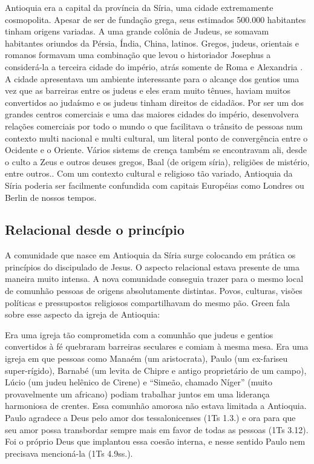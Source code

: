 \documentclass[
	12pt,				%
	openright,			%
	twoside,			%
	a4paper,			%
	english,			%
	french,				%
	spanish,			%
	brazil				%
	]{abntex2}
\begin{document}
Antioquia era a capital da província da Síria, uma cidade extremamente cosmopolita. Apesar de ser de fundação grega, seus estimados 500.000 habitantes tinham origens variadas. A uma grande colônia de Judeus, se somavam habitantes oriundos da Pérsia, Índia, China, latinos. Gregos, judeus, orientais e romanos formavam uma combinação que levou o historiador Josephus a considerá-la a terceira cidade do império, atrás somente de Roma e Alexandria \cite[185]{stott}. A cidade apresentava um ambiente interessante para o alcançe dos gentios uma vez que as barreiras entre os judeus e eles eram muito tênues, haviam muitos convertidos ao judaísmo e os judeus tinham direitos de cidadãos. Por ser um dos grandes centros comerciais e uma das maiores cidades do império, desenvolvera relações comerciais por todo o mundo o que facilitava o trânsito de pessoas num contexto multi nacional e multi cultural, um literal ponto de convergência entre o Ocidente e o Oriente. Vários sistems de crença também se encontravam ali, desde o culto a Zeus e outros deuses gregos, Baal (de origem síria), religiões de mistério, entre outros.\cite[166,167]{green}. Com um contexto cultural e religioso tão variado, Antioquia da Síria poderia ser facilmente  confundida com capitais Européias como Londres ou Berlin de nossos tempos.

\subsection {Relacional desde o princípio}

A comunidade que nasce em Antioquia da Síria surge colocando em prática os princípios do discipulado de Jesus. O aspecto relacional estava presente de uma maneira muito intensa. A nova comunidade conseguia trazer para o mesmo local de comunhão pessoas de origens absolutamente distintas. Povos, culturas, visões políticas e pressupostos religiosos compartilhavam do mesmo pão. Green fala sobre esse aspecto da igreja de Antioquia:

\begin{citacao}
Era uma igreja tão comprometida com a comunhão que judeus e gentios convertidos à fé quebraram barreiras seculares e comiam à mesma mesa. Era uma igreja em que pessoas como Manaém (um aristocrata), Paulo (um ex-fariseu super-rígido), Barnabé (um levita de Chipre e antigo proprietário de um campo), Lúcio (um judeu helênico de Cirene) e “Simeão, chamado Níger” (muito provavelmente um africano)
podiam trabalhar juntos em uma liderança harmoniosa de crentes. Essa comunhão amorosa não estava limitada a Antioquia. Paulo agradece a Deus pelo amor dos tessalonicenses (1Ts 1.3.) e ora para que seu amor possa transbordar sempre mais em favor de todas as pessoas (1Ts 3.12). Foi o próprio Deus que
implantou essa coesão interna, e nesse sentido Paulo nem precisava mencioná-la (1Ts 4.9ss.).
\end{citacao}\cite[261]{green}
\end{document}
